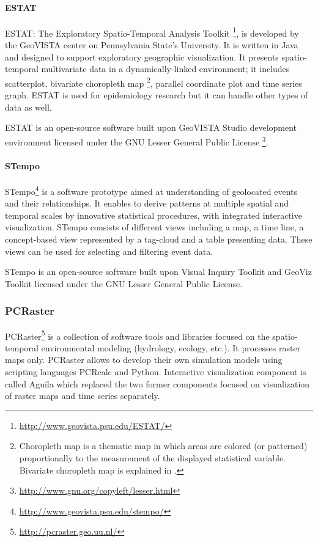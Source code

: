 \documentclass[a4paper,12pt,oneside]{book}
\begin{document}
\paragraph{ESTAT}
ESTAT: The Exploratory Spatio-Temporal Analysis Toolkit%
\footnote{\url{http://www.geovista.psu.edu/ESTAT/}},
is developed by the GeoVISTA
center on Pennsylvania State's University. It is written in Java and designed to support exploratory
geographic visualization. It presents spatio-temporal multivariate data
in a dynamically-linked environment; it includes scatterplot, bivariate choropleth map%
\footnote{Choropleth map is a thematic map in which areas are colored
(or patterned) proportionally to the measurement of the displayed statistical variable.
Bivariate choropleth map is explained in \cite{leonowicz2006two}.},
parallel coordinate plot and time series graph.
ESTAT is used for epidemiology research but it can handle other types of data as well.

ESTAT is an open-source software built upon GeoVISTA Studio development environment
licensed under the GNU Lesser General Public License%
\footnote{\url{http://www.gnu.org/copyleft/lesser.html}}.

\paragraph{STempo}
STempo\footnote{\url{http://www.geovista.psu.edu/stempo/}} is a software prototype aimed at
understanding of geolocated events and their relationships.
It enables to derive patterns at multiple spatial and temporal scales by innovative statistical procedures,
with integrated interactive visualization.
STempo consists of different views including a map, a time line,
a concept-based view represented by a tag-cloud and a table presenting data.
These views can be used for selecting and filtering event data.

STempo is an open-source software built upon Visual Inquiry Toolkit and GeoViz Toolkit
licensed under the GNU Lesser General Public License.

\subsubsection{PCRaster}
PCRaster\footnote{\url{http://pcraster.geo.uu.nl/}}
is a collection of software tools and libraries focused on the spatio-temporal
environmental modeling (hydrology, ecology, etc.). It processes raster maps only.
PCRaster allows to develop their own simulation models using scripting languages PCRcalc and Python.
Interactive visualization component is called Aguila
which replaced the two former components focused on visualization of raster maps
and time series separately.
\end{document}
